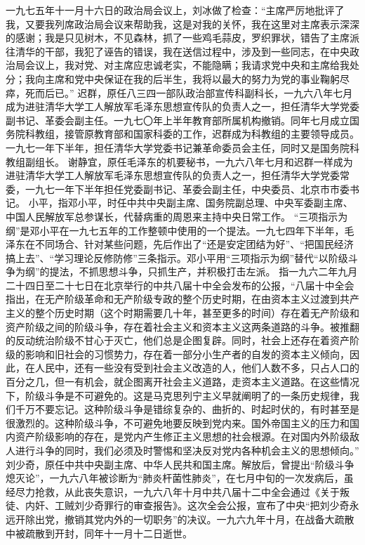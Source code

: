 \begin{maonote}
一九七五年十一月十六日的政治局会议上，刘冰做了检查：“主席严厉地批评了我，又要我列席政治局会议来帮助我，这是对我的关怀，我在这里对主席表示深深的感谢；我是只见树木，不见森林，抓了一些鸡毛蒜皮，罗织罪状，错告了主席派往清华的干部，我犯了诬告的错误，我在送信过程中，涉及到一些同志，在中央政治局会议上，我对党、对主席应忠诚老实，不能隐瞒；我请求党中央和主席给我处分；我向主席和党中央保证在我的后半生，我将以最大的努力为党的事业鞠躬尽瘁，死而后已。”
迟群，原任八三四一部队政治部宣传科副科长，一九六八年七月成为进驻清华大学工人解放军毛泽东思想宣传队的负责人之一，担任清华大学党委副书记、革委会副主任。一九七〇年上半年教育部所属机构撤销。同年七月成立国务院科教组，接管原教育部和国家科委的工作，迟群成为科教组的主要领导成员。一九七一年下半年，担任清华大学党委书记兼革命委员会主任，同时又是国务院科教组副组长。
谢静宜，原任毛泽东的机要秘书，一九六八年七月和迟群一样成为进驻清华大学工人解放军毛泽东思想宣传队的负责人之一，担任清华大学党委常委，一九七一年下半年担任党委副书记、革委会副主任，中央委员、北京市市委书记。
小平，指邓小平，时任中共中央副主席、国务院副总理、中央军委副主席、中国人民解放军总参谋长，代替病重的周恩来主持中央日常工作。
“三项指示为纲”是邓小平在一九七五年的工作整顿中使用的一个提法。一九七四年下半年，毛泽东在不同场合、针对某些问题，先后作出了“还是安定团结为好”、“把国民经济搞上去”、“学习理论反修防修”三条指示。邓小平用“三项指示为纲”替代“以阶级斗争为纲”的提法，不抓思想斗争，只抓生产，并积极打击左派。
指一九六二年九月二十四日至二十七日在北京举行的中共八届十中全会发布的公报，“八届十中全会指出，在无产阶级革命和无产阶级专政的整个历史时期，在由资本主义过渡到共产主义的整个历史时期（这个时期需要几十年，甚至更多的时间）存在着无产阶级和资产阶级之间的阶级斗争，存在着社会主义和资本主义这两条道路的斗争。被推翻的反动统治阶级不甘心于灭亡，他们总是企图复辟。同时，社会上还存在着资产阶级的影响和旧社会的习惯势力，存在着一部分小生产者的自发的资本主义倾向，因此，在人民中，还有一些没有受到社会主义改造的人，他们人数不多，只占人口的百分之几，但一有机会，就企图离开社会主义道路，走资本主义道路。在这些情况下，阶级斗争是不可避免的。这是马克思列宁主义早就阐明了的一条历史规律，我们千万不要忘记。这种阶级斗争是错综复杂的、曲折的、时起时伏的，有时甚至是很激烈的。这种阶级斗争，不可避免地要反映到党内来。国外帝国主义的压力和国内资产阶级影响的存在，是党内产生修正主义思想的社会根源。在对国内外阶级敌人进行斗争的同时，我们必须及时警惕和坚决反对党内各种机会主义的思想倾向。”
刘少奇，原任中共中央副主席、中华人民共和国主席。解放后，曾提出“阶级斗争熄灭论”，一九六八年被诊断为“肺炎杆菌性肺炎”，在七月中旬的一次发病后，虽经尽力抢救，从此丧失意识，一九六八年十月中共八届十二中全会通过《关于叛徒、内奸、工贼刘少奇罪行的审查报告》。这次全会公报，宣布了中央“把刘少奇永远开除出党，撤销其党内外的一切职务”的决议。一九六九年十月，在战备大疏散中被疏散到开封，同年十一月十二日逝世。

\end{maonote}
